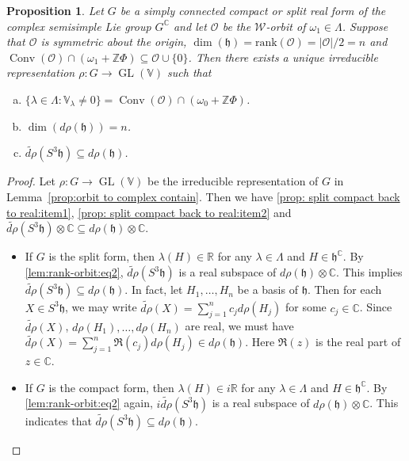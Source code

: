 \documentclass[11pt,reqno]{amsart}
\DeclareMathOperator{\GL}{GL}
\DeclareMathOperator{\Conv}{Conv}
\newtheorem{proposition}[theorem]{Proposition}
\newcommand{\rank}{\mathrm{rank}} %
\newcommand{\W}{\mathcal{W}}
\begin{document}
\begin{proposition}\label{prop: split compact back to real}
Let $G$ be a simply connected compact or split real form of the complex semisimple Lie group $G^{\mathbb{C}}$ and let $\mathcal{O}$ be the $\W$-orbit of $\omega_1 \in \Lambda$.  Suppose that $\mathcal{O}$ is symmetric about the origin,  $\dim (\mathfrak{h}) = \rank(\mathcal{O}) = |\mathcal{O}|/2 = n$ and $\Conv(\mathcal{O}) \cap \left( \omega_1 + \mathbb{Z} \Phi \right) \subseteq \mathcal{O} \cup \{ 0 \}$.   Then there exists a unique irreducible representation $\rho: G \to \GL(\mathbb{V})$ such that 
\begin{enumerate}[a)]
\item $\{\lambda \in \Lambda: \mathbb{V}_{\lambda} \ne 0 \} = \Conv(\mathcal{O}) \cap (\omega_0 + \mathbb{Z} \Phi)$.  \label{prop: split compact back to real:item1}
\item $\dim \left( d \rho (\mathfrak{h} ) \right) = n$. \label{prop: split compact back to real:item2}
\item $\widetilde{ d \rho } \left( S^3 \mathfrak{h} \right) \subseteq d \rho (\mathfrak{h})$.  \label{prop: split compact back to real:item3}
\end{enumerate}
\end{proposition}
\begin{proof}
Let $\rho: G \to \GL(\mathbb{V})$ be the irreducible representation of $G$ in Lemma~\ref{prop:orbit to complex contain}.  Then we have \eqref{prop: split compact back to real:item1},  \eqref{prop: split compact back to real:item2} and $\widetilde{d\rho} \left( S^3 \mathfrak{h} \right) \otimes \mathbb{C} \subseteq d\rho (\mathfrak{h}) \otimes \mathbb{C}$.  
\begin{itemize}
\item[$\diamond$] If $G$ is the split form,  then $\lambda(H) \in \mathbb{R}$ for any $\lambda \in \Lambda$ and $H\in \mathfrak{h}^{\mathbb{C}}$.  By \eqref{lem:rank-orbit:eq2},  $\widetilde{d\rho} \left( S^3 \mathfrak{h} \right) $ is a real subspace of $d\rho (\mathfrak{h}) \otimes \mathbb{C}$.  This implies $\widetilde{d\rho} \left( S^3 \mathfrak{h} \right) \subseteq d\rho (\mathfrak{h})$.  In fact,  let $H_1,\dots,  H_n$ be a basis of $\mathfrak{h}$.  Then for each $X \in S^3 \mathfrak{h}$,  we may write $\widetilde{d\rho} (X) = \sum_{j=1}^n c_j d\rho (H_j)$ for some $c_j \in \mathbb{C}$.  Since $\widetilde{d\rho} (X)$,  $d \rho(H_1),\dots,  d \rho(H_n)$ are real,  we must have $\widetilde{d\rho} (X) = \sum_{j=1}^n \Re(c_j) d\rho (H_j) \in d\rho(\mathfrak{h})$.  Here $\Re(z)$ is the real part of $z\in \mathbb{C}$.
\item[$\diamond$] If $G$ is the compact form,  then $\lambda(H) \in i \mathbb{R} $ for any $\lambda \in \Lambda$ and $H\in \mathfrak{h}^{\mathbb{C}}$.  By \eqref{lem:rank-orbit:eq2} again,  $i \widetilde{d\rho} \left( S^3 \mathfrak{h} \right) $ is a real subspace of $d\rho (\mathfrak{h}) \otimes \mathbb{C}$.  This indicates that $\widetilde{d\rho} \left( S^3 \mathfrak{h} \right) \subseteq d\rho (\mathfrak{h})$.  \qedhere
\end{itemize}
\end{proof}
\end{document}
